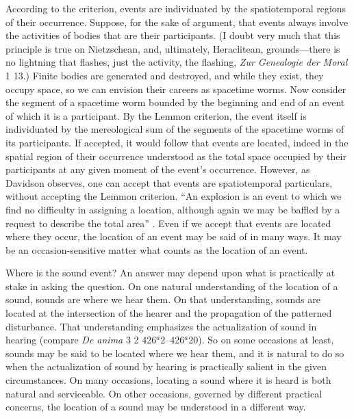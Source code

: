 According to the \citet{Lemmon:1967aa} criterion, events are individuated by the spatiotemporal regions of their occurrence. Suppose, for the sake of argument, that events always involve the activities of bodies that are their participants. (I doubt very much that this principle is true on Nietzschean, and, ultimately, Heraclitean, grounds---there is no lightning that flashes, just the activity, the flashing, \emph{Zur Genealogie der Moral} 1 13.) Finite bodies are generated and destroyed, and while they exist, they occupy space, so we can envision their careers as spacetime worms. Now consider the segment of a spacetime worm bounded by the beginning and end of an event of which it is a participant. By the Lemmon criterion, the event itself is individuated by the mereological sum of the segments of the spacetime worms of its participants. If accepted, it would follow that events are located, indeed in the spatial region of their occurrence understood as the total space occupied by their participants at any given moment of the event's occurrence. However, as Davidson observes, one can accept that events are spatiotemporal particulars, without accepting the Lemmon criterion. ``An explosion is an event to which we find no difficulty in assigning a location, although again we may be baffled by a request to describe the total area'' \citep[304]{Davidson:1969da}. Even if we accept that events are located where they occur, the location of an event may be said of in many ways. It may be an occasion-sensitive matter what counts as the location of an event. 

Where is the sound event? An answer may depend upon what is practically at stake in asking the question. On one natural understanding of the location of a sound, sounds are where we hear them. On that understanding, sounds are located at the intersection of the hearer and the propagation of the patterned disturbance. That understanding emphasizes the actualization of sound in hearing (compare \emph{De anima} 3 2 426\( ^{a} \)2--426\( ^{a} \)20). So on some occasions at least, sounds may be said to be located where we hear them, and it is natural to do so when the actualization of sound by hearing is practically salient in the given circumstances. On many occasions, locating a sound where it is heard is both natural and serviceable. On other occasions, governed by different practical concerns, the location of a sound may be understood in a different way. 

